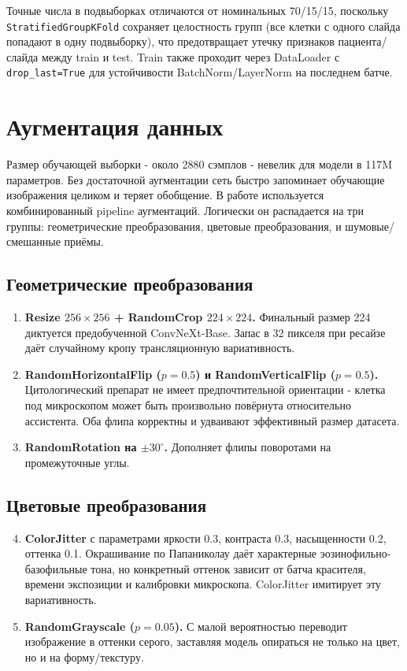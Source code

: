 \documentclass[14pt,a4paper]{extreport}
\begin{document}
Точные числа в подвыборках отличаются от номинальных 70/15/15, поскольку
\texttt{StratifiedGroupKFold} сохраняет целостность групп (все клетки с
одного слайда попадают в одну подвыборку), что предотвращает утечку признаков
пациента/слайда между train и test. Train также проходит через DataLoader с
\texttt{drop\_last=True} для устойчивости BatchNorm/LayerNorm на последнем
батче.

\section{Аугментация данных}
\label{sec:augmentation}

Размер обучающей выборки - около 2880 сэмплов - невелик для модели в
117M параметров. Без достаточной аугментации сеть быстро запоминает
обучающие изображения целиком и теряет обобщение. В работе используется
комбинированный pipeline аугментаций. Логически он распадается на три
группы: геометрические преобразования, цветовые преобразования, и
шумовые/смешанные приёмы.

\subsection{Геометрические преобразования}

\begin{enumerate}
    \item \textbf{Resize $256 \times 256$ + RandomCrop $224 \times 224$.}
          Финальный размер 224 диктуется предобученной ConvNeXt-Base.
          Запас в 32 пикселя при ресайзе даёт случайному кропу
          трансляционную вариативность.
    \item \textbf{RandomHorizontalFlip ($p=0.5$) и
          RandomVerticalFlip ($p=0.5$).} Цитологический препарат не имеет
          предпочтительной ориентации - клетка под микроскопом может
          быть произвольно повёрнута относительно ассистента. Оба флипа
          корректны и удваивают эффективный размер датасета.
    \item \textbf{RandomRotation на $\pm 30^\circ$.} Дополняет флипы
          поворотами на промежуточные углы.
\end{enumerate}

\subsection{Цветовые преобразования}

\begin{enumerate}
    \setcounter{enumi}{3}
    \item \textbf{ColorJitter} с параметрами яркости 0.3, контраста 0.3,
          насыщенности 0.2, оттенка 0.1. Окрашивание по Папаниколау
          даёт характерные эозинофильно-базофильные тона, но конкретный
          оттенок зависит от батча красителя, времени экспозиции и
          калибровки микроскопа. ColorJitter имитирует эту
          вариативность.
    \item \textbf{RandomGrayscale ($p=0.05$).} С малой вероятностью
          переводит изображение в оттенки серого, заставляя модель
          опираться не только на цвет, но и на форму/текстуру.
\end{enumerate}
\end{document}

